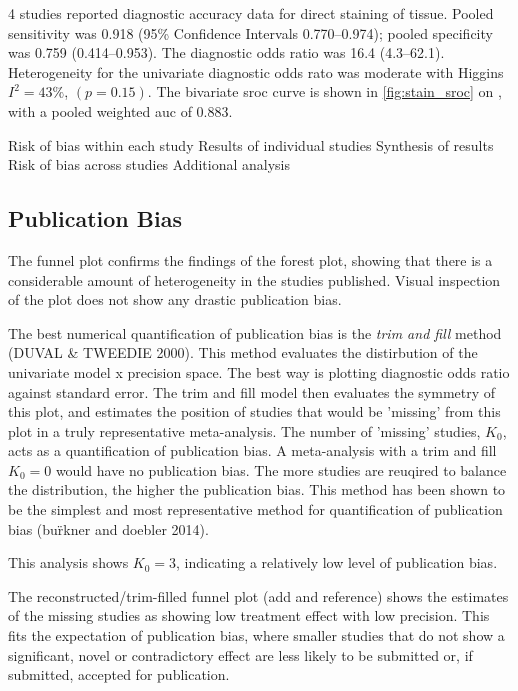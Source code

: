 4 studies reported diagnostic accuracy data for direct staining of tissue.
Pooled sensitivity was 0.918 (95\% Confidence Intervals 0.770--0.974); pooled specificity was 0.759 (0.414--0.953).
The diagnostic odds ratio was 16.4 (4.3--62.1).
Heterogeneity for the univariate diagnostic odds rato was moderate with Higgins $I^2 = 43\%$, $(p=0.15)$.
The bivariate \gls{sroc} curve is shown in \cref{fig:stain_sroc} on , with a pooled weighted \gls{auc} of 0.883.



Risk of bias within each study
Results of individual studies
Synthesis of results
Risk of bias across studies
Additional analysis

\subsection{Publication Bias}

The funnel plot confirms the findings of the forest plot, showing that there is a considerable amount of heterogeneity in the studies published.
Visual inspection of the plot does not show any drastic publication bias.

The best numerical quantification of publication bias is the \emph{trim and fill} method (DUVAL \& TWEEDIE 2000).
This method evaluates the distirbution of the univariate model x precision space.
The best way is plotting diagnostic odds ratio against standard error.
The trim and fill model then evaluates the symmetry of this plot, and estimates the position of studies that would be 'missing' from this plot in a truly representative meta-analysis.
The number of 'missing' studies, $K_0$, acts as a quantification of publication bias.
A meta-analysis with a trim and fill $K_0 = 0$ would have no publication bias.
The more studies are reuqired to balance the distribution, the higher the publication bias.
This method has been shown to be the simplest and most representative method for quantification of publication bias (bu\"rkner and doebler 2014).


This analysis shows $K_0 = 3$, indicating a relatively low level of publication bias.

The reconstructed/trim-filled funnel plot (add and reference) shows the estimates of the missing studies as showing low treatment effect with low precision.
This fits the expectation of publication bias, where smaller studies that do not show a significant, novel or contradictory effect are less likely to be submitted or, if submitted, accepted for publication.
